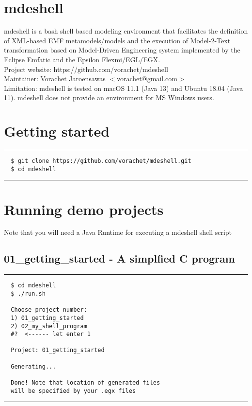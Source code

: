 \documentclass[12pt]{article}
\begin{document}

\section*{mdeshell}

mdeshell is a bash shell based modeling environment that facilitates the definition of XML-based EMF metamodels/models and the execution of Model-2-Text transformation based on Model-Driven Engineering system implemented by the Eclipse Emfatic and the Epsilon Flexmi/EGL/EGX.  \\

Project website: https://github.com/vorachet/mdeshell \\

Maintainer: Vorachet Jaroensawas $<$vorachet@gmail.com$>$ \\

Limitation: mdeshell is tested on macOS 11.1 (Java 13) and Ubuntu 18.04 (Java 11). mdeshell does not provide an environment for MS Windows users. 



\section*{Getting started}
\noindent\rule{8cm}{0.4pt}
\begin{lstlisting}
  $ git clone https://github.com/vorachet/mdeshell.git
  $ cd mdeshell
\end{lstlisting}
\noindent\rule{8cm}{0.4pt}


\section*{Running demo projects}

Note that you will need a Java Runtime for executing a mdeshell shell script 

\subsection*{01\_getting\_started - A simplfied C program}
\noindent\rule{8cm}{0.4pt}
\begin{lstlisting}
  $ cd mdeshell
  $ ./run.sh 

  Choose project number:
  1) 01_getting_started
  2) 02_my_shell_program
  #?  <------ let enter 1

  Project: 01_getting_started 

  Generating...

  Done! Note that location of generated files 
  will be specified by your .egx files
\end{lstlisting}
\noindent\rule{8cm}{0.4pt}
\end{document}
